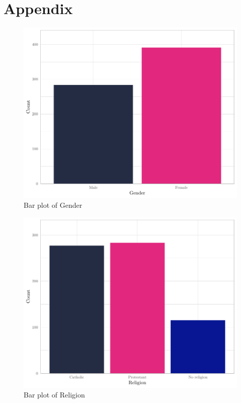\documentclass[
]{article}
\begin{document}
\pagebreak

\hypertarget{appendix}{%
\section{Appendix}\label{appendix}}

\begin{figure}[H]

{\centering \includegraphics[width=0.8\linewidth]{paper_files/figure-latex/unnamed-chunk-5-1} 

}

\caption{Bar plot of Gender}\label{fig:unnamed-chunk-5}
\end{figure}

\begin{figure}[H]

{\centering \includegraphics[width=0.8\linewidth]{paper_files/figure-latex/unnamed-chunk-6-1} 

}

\caption{Bar plot of Religion}\label{fig:unnamed-chunk-6}
\end{figure}
\end{document}
